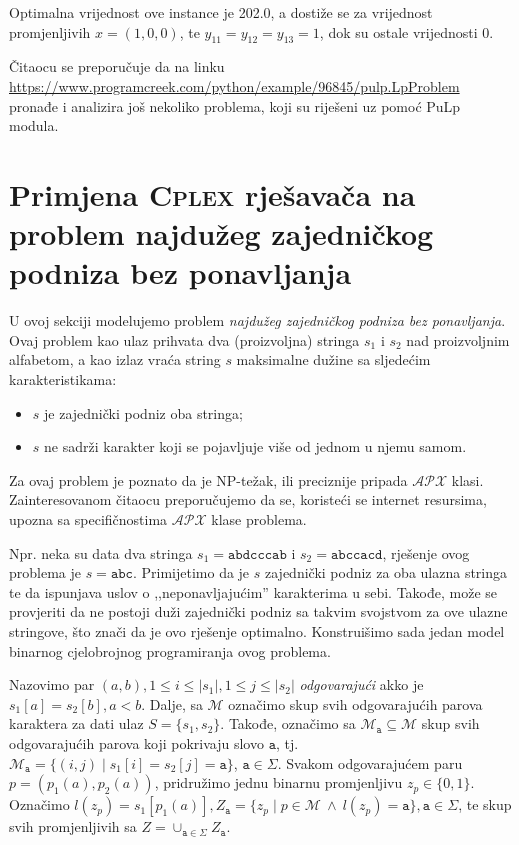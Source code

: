\documentclass[b5paper, utf8, 11pt, colorlinks]{book}
\theoremstyle{definition}
\begin{document}
 Optimalna vrijednost ove instance je 202.0, a dostiže se za vrijednost promjenljivih $x = (1, 0, 0)$, te $y_{11}= y_{12}= y_{13} = 1$, dok su ostale vrijednosti 0.
 
Čitaocu se preporučuje da na linku \url{https://www.programcreek.com/python/example/96845/pulp.LpProblem}
pronađe i analizira još nekoliko problema, koji su riješeni uz pomoć PuLp modula. 
 
 \section{Primjena \textsc{Cplex} rješavača na problem najdužeg zajedničkog podniza bez ponavljanja}
 
 U ovoj sekciji modelujemo problem \emph{najdužeg zajedničkog podniza bez ponavljanja}. Ovaj problem kao ulaz prihvata dva (proizvoljna) stringa $s_1$ i $s_2$ nad proizvoljnim alfabetom, a kao izlaz vraća string $s$ maksimalne dužine sa sljedećim karakteristikama:  
 \begin{itemize}
 	\item $s$ je zajednički podniz oba stringa; 
 	\item $s$ ne sadrži karakter koji se pojavljuje više od jednom u njemu samom.
 \end{itemize}
Za ovaj problem je poznato da je NP-težak, ili preciznije pripada $\mathcal{APX}$ klasi. Zainteresovanom čitaocu preporučujemo da se, koristeći se internet resursima, upozna sa specifičnostima $\mathcal{APX}$ klase problema.

Npr. neka su data dva stringa $s_1 = \texttt{abdcccab}$ i $s_2=\texttt{abccacd}$, rješenje ovog problema je $s=\texttt{abc}$. Primijetimo da je $s$ zajednički podniz za oba ulazna stringa te da ispunjava uslov o ,,neponavljajućim'' karakterima u sebi. Takođe, može se provjeriti da ne postoji duži zajednički podniz sa takvim svojstvom za ove ulazne stringove, što znači da je ovo rješenje optimalno. Konstruišimo sada jedan model binarnog cjelobrojnog programiranja ovog problema. 

Nazovimo par $(a, b), 1 \leq i \leq |s_1|, 1 \leq j \leq |s_2|$ \emph{odgovarajući} akko je $s_1[a]=s_2[b], a < b$. Dalje, sa $\mathcal{M}$ označimo skup svih odgovarajućih parova karaktera za dati ulaz $S=\{s_1, s_2\}$. Takođe, označimo sa  $\mathcal{M}_{\texttt{a}} \subseteq \mathcal{M}$  skup svih odgovarajućih parova koji pokrivaju slovo $\texttt{a}$, tj. 
$\mathcal{M}_{\texttt{a}} = \{ (i, j) \mid s_1[i]=s_2[j]=\texttt{a}\}$, $\texttt{a} \in \Sigma$. Svakom odgovarajućem paru $p=(p_1(a),p_2(a))$, pridružimo jednu binarnu promjenljivu $z_{p} \in \{0, 1\}$. Označimo $l(z_p)= s_1[ p_1(a) ], Z_{\texttt{a}} = \{ z_p \mid p \in \mathcal{M} \ \wedge\  l(z_p) = \texttt{a}\}, \texttt{a}\in \Sigma$, te skup svih promjenljivih sa $Z = \cup_{\texttt{a} \in \Sigma} Z_{\texttt{a}}$. 
\end{document}
